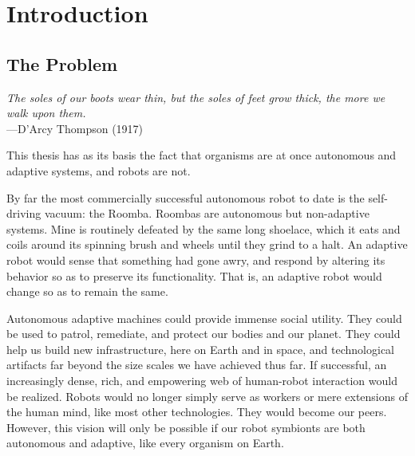 

\chapter{Introduction}


\section{The Problem}


\begin{changemargin}{4em}{4em} 

\vspace{1em}

    \textit{The soles of our boots wear thin, but the soles of feet grow thick, the more we walk upon them.} \\[4pt]
    \hspace*{16.5em} ---D'Arcy Thompson (1917)
    
\vspace{1em}
    
    
\end{changemargin}


\noindent
This thesis has as its basis the fact that organisms are at once autonomous and adaptive systems, and robots are not.

By far the most commercially successful autonomous robot to date is the self-driving vacuum: the Roomba. 
Roombas are autonomous but non-adaptive systems.
Mine is routinely defeated by the same long shoelace, which it eats and coils around its spinning brush and wheels until they grind to a halt.
An adaptive robot would sense that something had gone awry, and respond by altering its behavior so as to preserve its functionality.
That is, an adaptive robot would change so as to remain the same.


Autonomous adaptive machines could provide immense social utility.
They could be used to patrol, remediate, and protect our bodies and our planet. 
They could help us build new infrastructure,
here on Earth and in space,
and technological artifacts
far beyond the size scales we have achieved thus far.
If successful, an increasingly dense, rich, and empowering web of human-robot interaction would be realized.
Robots would no longer simply serve as workers or mere extensions of the human mind, like most other technologies.
They would become our peers.
However, this vision will only be possible if our robot symbionts are both autonomous and adaptive, like every organism on Earth.


